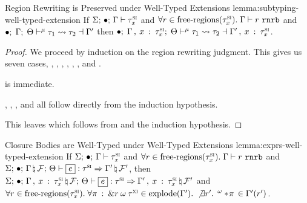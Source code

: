 \begin{oxlemma}{Region Rewriting is Preserved under Well-Typed Extensions}
  {lemma:subtyping-well-typed-extension} If
  $\Sigma; \, \bullet; \, \Gamma \vdash \tau^\textsc{si}_x$ and
  $\forall r \in \textrm{free-regions}(\tau^\textsc{si}_x). \;
  \Gamma \vdash r \ \mathtt{rnrb}$ and
  $\bullet; \; \Gamma; \; \Theta \vdash^{\mu} \tau_1 \leadsto \tau_2 \dashv \Gamma^\prime$
  then $\bullet; \;  \Gamma \, , \: 
      x \: : \: \tau^\textsc{si}_x ; \; \Theta \vdash^{\mu} \tau_1 \leadsto \tau_2 \dashv 
    \Gamma^\prime \, , \:  x \: : \: \tau^\textsc{si}_x$.
\end{oxlemma}

\begin{proof}
  We proceed by induction on the region rewriting judgment. This gives us seven
  cases, , , ,
  , , , and
  .

   is immediate.

  , , ,  and
   all follow directly from the induction hypothesis.

  This leaves  which follows from
   and the induction hypothesis.
\end{proof}

\begin{oxlemma}{Closure Bodies are Well-Typed under Well-Typed Extensions}
  {lemma:exprs-well-typed-extension} If
  $\Sigma; \, \bullet; \, \Gamma \vdash \tau^\textsc{si}_x$ and
  $\forall r \in \textrm{free-regions}(\tau^\textsc{si}_x). \;
  \Gamma \vdash r \ \mathtt{rnrb}$ and
  $\oxtypjudge{\oxglobalctx}{\oxemptyctx}{\oxkontctx}{
    \oxnewframe{\oxvarctx}{\oxframe} }{\oxexpr}{\oxsitype}{
    \oxnewframe{\oxvarctx^\prime}{\oxframe^\prime} }$, then
  $\oxtypjudge{\oxglobalctx}{\oxemptyctx}{\oxkontctx}{ \oxnewframe{
      \oxextendctx{\oxvarctx}{ \oxvarctxentry{\oxid}{\oxsitype_\oxid} }
    }{\oxframe} }{\oxexpr}{\oxsitype}{ \oxnewframe{
      \oxextendctx{\oxvarctx^\prime}{ \oxvarctxentry{\oxid}{\oxsitype_\oxid} }
    }{\oxframe^\prime} }$ and $\forall r \in \textrm{free-regions}(\tau^\textsc{si}_x).
  \; \forall \pi \: : \: \& r \: \omega \: \tau^\textsc{xi} \in
  \textrm{explode}(\Gamma^\prime). \; \not\exists r^\prime. \;
  \,^{\omega}* \! \pi\, \in
  \Gamma^\prime(r^\prime)$.
\end{oxlemma}

